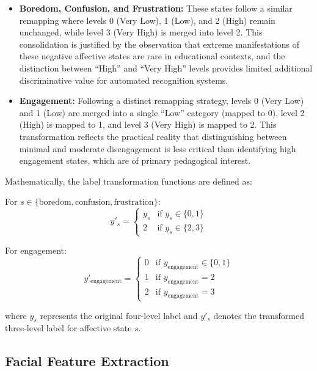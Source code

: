 \documentclass[11pt,a4paper]{article}
\begin{document}
\begin{itemize}
    \item \textbf{Boredom, Confusion, and Frustration:} These states follow a similar remapping where levels 0 (Very Low), 1 (Low), and 2 (High) remain unchanged, while level 3 (Very High) is merged into level 2. This consolidation is justified by the observation that extreme manifestations of these negative affective states are rare in educational contexts, and the distinction between ``High'' and ``Very High'' levels provides limited additional discriminative value for automated recognition systems.

    \item \textbf{Engagement:} Following a distinct remapping strategy, levels 0 (Very Low) and 1 (Low) are merged into a single ``Low'' category (mapped to 0), level 2 (High) is mapped to 1, and level 3 (Very High) is mapped to 2. This transformation reflects the practical reality that distinguishing between minimal and moderate disengagement is less critical than identifying high engagement states, which are of primary pedagogical interest.
\end{itemize}

Mathematically, the label transformation functions are defined as:

For $s \in \{\text{boredom}, \text{confusion}, \text{frustration}\}$:
\begin{equation}
y'_s = \begin{cases}
y_s & \text{if } y_s \in \{0, 1\} \\
2 & \text{if } y_s \in \{2, 3\}
\end{cases}
\end{equation}

For engagement:
\begin{equation}
y'_{\text{engagement}} = \begin{cases}
0 & \text{if } y_{\text{engagement}} \in \{0, 1\} \\
1 & \text{if } y_{\text{engagement}} = 2 \\
2 & \text{if } y_{\text{engagement}} = 3
\end{cases}
\end{equation}

where $y_s$ represents the original four-level label and $y'_s$ denotes the transformed three-level label for affective state $s$.

\subsection{Facial Feature Extraction}
\end{document}
